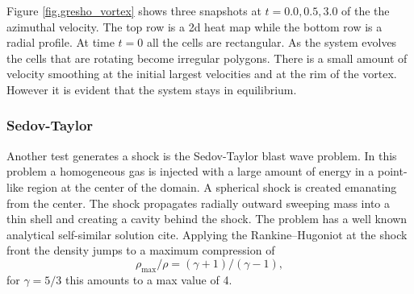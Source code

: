Figure \ref{fig.gresho_vortex} shows three snapshots at $t=0.0, 0.5, 3.0$ of the the azimuthal
velocity. The top row is a 2d heat map while the bottom row is a radial profile. At time $t=0$
all the cells are rectangular. As the system evolves the cells that are rotating become irregular 
polygons. There is a small amount of velocity smoothing at the initial largest velocities and at
the rim of the vortex. However it is evident that the system stays in equilibrium.

\subsubsection{Sedov-Taylor}
Another test generates a shock is the Sedov-Taylor blast wave problem. In this problem a homogeneous
gas is injected with a large amount of energy in a point-like region at the center of the domain.
A spherical shock is created emanating from the center. The shock propagates radially outward
sweeping mass into a thin shell and creating a cavity behind the shock. The problem has a well known
analytical self-similar solution cite. Applying the Rankine–Hugoniot at the shock front the density
jumps to a maximum compression of
\begin{equation}
	\rho_{\mathrm{max}}/\rho = (\gamma + 1)/(\gamma - 1),
\end{equation}
for $\gamma = 5/3$ this amounts to a max value of 4.

